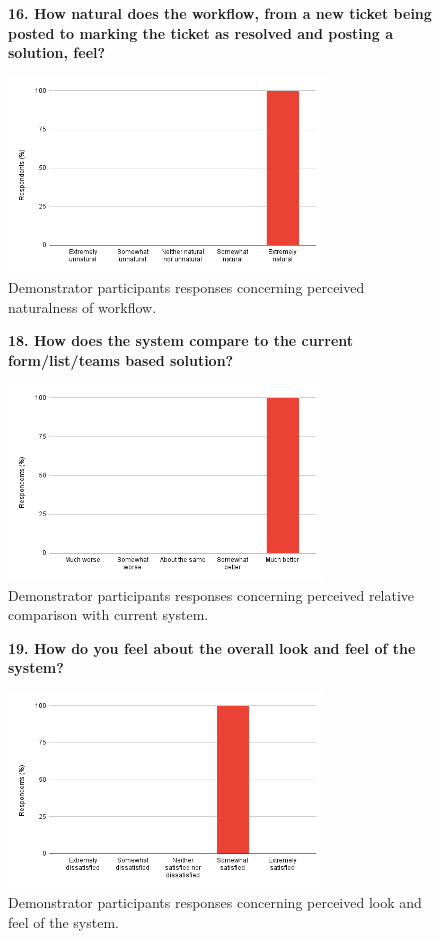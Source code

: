 \begin{figure}[H]
    \centering
    \textbf{16. How natural does the workflow, from a new ticket being posted to marking the ticket as resolved and posting a solution, feel?}\par\medskip
    \includegraphics[width=0.75\textwidth]{10evaluation/images/dem(2)1.png}
    \caption{Demonstrator participants responses concerning perceived naturalness of workflow.}
    \label{fig:dem16}
\end{figure}

\begin{figure}[H]
    \centering
    \textbf{18. How does the system compare to the current form/list/teams based solution?}\par\medskip
    \includegraphics[width=0.75\textwidth]{10evaluation/images/dem(2)3.png}
    \caption{Demonstrator participants responses concerning perceived relative comparison with current system.}
    \label{fig:dem18}
\end{figure}

\begin{figure}[H]
    \centering
    \textbf{19. How do you feel about the overall look and feel of the system?}\par\medskip
    \includegraphics[width=0.75\textwidth]{10evaluation/images/dem(2)4.png}
    \caption{Demonstrator participants responses concerning perceived look and feel of the system.}
    \label{fig:dem19}
\end{figure}

